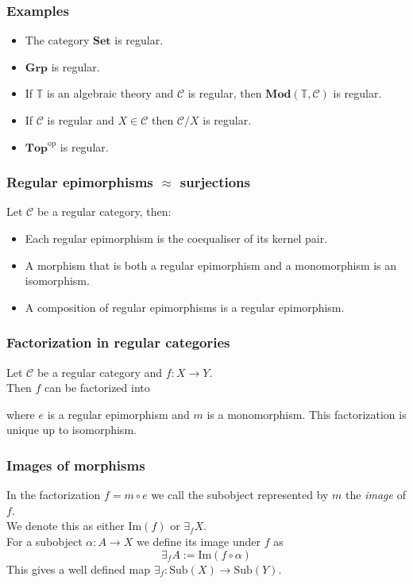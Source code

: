\documentclass[14pt]{beamer}
\theoremstyle{plain}
\begin{document}
  \begin{frame}
    \frametitle{Examples}
    \begin{itemize}
      \item<1-> The category $\mathbf{Set}$ is regular.
      \item<2-> $\mathbf{Grp}$ is regular.
      \item<3-> If $\mathbb{T}$ is an algebraic theory and $\mathcal{C}$ is regular,
        then $\mathbf{Mod}(\mathbb{T}, \mathcal{C})$ is regular.
      \item<4-> If $\mathcal{C}$ is regular and $X \in \mathcal{C}$ then $\mathcal{C}/X$
        is regular.
      \item<5-> $\mathbf{Top}^{\mathrm{op}}$ is regular.
    \end{itemize}
  \end{frame}

  \begin{frame}
    \frametitle{Regular epimorphisms $\approx$ surjections}
      Let $\mathcal{C}$ be a regular category, then:
      \begin{itemize}
        \item<2-> Each regular epimorphism is the coequaliser of its kernel pair.
        \item<3-> A morphism that is both a regular epimorphism and a monomorphism is an
          isomorphism.
        \item<4-> A composition of regular epimorphisms is a regular epimorphism.
      \end{itemize}
  \end{frame}

  \begin{frame}[fragile]
    \frametitle{Factorization in regular categories}
    Let $\mathcal{C}$ be a regular category and $f : X \to Y$.
    \pause \\
    Then $f$ can be factorized into
    \begin{center}
    \end{center}
    where $e$ is a regular epimorphism and $m$ is a monomorphism.
    \pause
    This factorization is unique up to isomorphism.
  \end{frame}

  \begin{frame}
    \frametitle{Images of morphisms}
    In the factorization $f = m \circ e$ we call the subobject represented by $m$
    the \emph{image} of $f$.
    \pause \\
    \vspace*{1em}
    We denote this as either $\mathrm{Im}(f)$ or $\exists_f X$.
    \pause \\
    \vspace*{1em}
    For a subobject $\alpha : A \to X$ we define its image under $f$ as
    \[ \exists_f A := \mathrm{Im}(f \circ \alpha) \]
    This gives a well defined map $\exists_f : \mathrm{Sub}(X) \to \mathrm{Sub}(Y)$.
  \end{frame}
  
\end{document}
